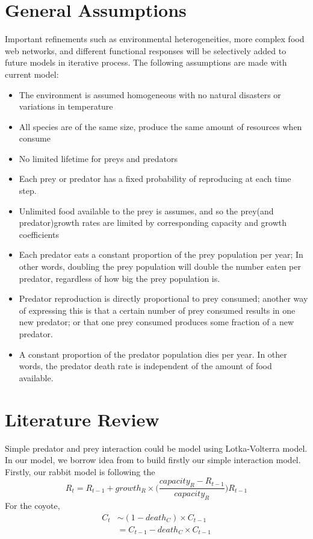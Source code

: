 \documentclass{article}
\begin{document}
\begin{normalsize}
		\section{General Assumptions}
		Important refinements such as environmental heterogeneities, more complex food web networks, and different functional responses will be selectively added to future models in iterative process. The following assumptions are made with current model:
		\begin{itemize}
		    \item The environment is assumed homogeneous with no natural disasters or  variations in temperature
		    \item All species are of the same size, produce the same amount of resources when consume%
		    \item No limited lifetime for preys and predators
		    \item Each prey or predator has a fixed probability of reproducing at each time step.
		    \item Unlimited food available to the prey is assumes, and so the prey(and predator)growth rates are limited by corresponding capacity and growth coefficients
		    \item Each predator eats a constant proportion of the prey population per year; In other words, doubling the prey population will double the number eaten per predator, regardless of how big the prey population is.
		    \item Predator reproduction is directly proportional to prey consumed; another way of expressing this is that a certain number of prey consumed results in one new predator; or that one prey consumed produces some fraction of a new predator.
		    \item A constant proportion of the predator population dies per year. In other words, the predator death rate is independent of the amount of food available.
		\end{itemize}

		\section{Literature Review}
		Simple predator and prey interaction could be model using Lotka-Volterra model. In our model, we borrow idea from \cite{Sayama2013} to build firstly our simple interaction model. Firstly, our rabbit model is following the  
		\begin{equation}
		R_t = R_{t-1} + growth_{R} \times \big( \frac{capacity_{R} - R_{t-1}}{capacity_{R}} \big) R_{t-1}
		\end{equation}
		For the coyote,
		\begin{equation}
		\begin{aligned}
		C_t  & \sim (1 - death_{C}) \times C_{t-1} \\
		&= C_{t-1} - death_{C} \times C_{t-1}
		\end{aligned}
		\end{equation}
		

\end{normalsize}
\end{document}
